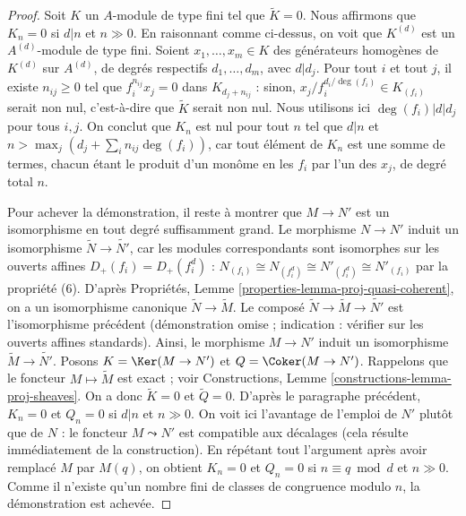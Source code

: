 \begin{proof}
\medskip\noindent
Soit $K$ un $A$-module de type fini tel que $\widetilde{K} = 0$. Nous affirmons que
$K_n = 0$ si $d|n$ et $n \gg 0$. En raisonnant comme ci-dessus, on voit que
$K^{(d)}$ est un $A^{(d)}$-module de type fini. Soient
$x_1, \ldots, x_m \in K$ des générateurs homogènes de $K^{(d)}$ sur
$A^{(d)}$, de degrés respectifs $d_1, \ldots, d_m$, avec $d | d_j$. Pour tout
$i$ et tout $j$, il existe $n_{ij} \geq 0$ tel que
$f_i^{n_{ij}} x_j = 0$ dans $K_{d_j + n_{ij}}$ : sinon,
$x_j/f_i^{d_i/\deg(f_i)} \in K_{(f_i)}$ serait non nul, c'est-à-dire que
$\widetilde{K}$ serait non nul. Nous utilisons ici
$\deg(f_i) | d | d_j$ pour tous $i, j$. On conclut que $K_n$ est nul pour tout
$n$ tel que $d | n$ et $n > \max_j (d_j + \sum_i n_{ij} \deg(f_i))$, car tout élément de
$K_n$ est une somme de termes, chacun étant le produit d'un monôme en les
$f_i$ par l'un des $x_j$, de degré total $n$.

\medskip\noindent
Pour achever la démonstration, il reste à montrer que $M \to N'$ est un
isomorphisme en tout degré suffisamment grand. Le morphisme $N \to N'$ induit
un isomorphisme $\widetilde{N} \to \widetilde{N'}$, car les modules
correspondants sont isomorphes sur les ouverts affines
$D_+(f_i) = D_+(f_i^d)$ :
$N_{(f_i)} \cong N_{(f_i^d)} \cong N'_{(f_i^d)} \cong N'_{(f_i)}$
par la propriété (6). D'après Propriétés, Lemme
\ref{properties-lemma-proj-quasi-coherent}, on a un isomorphisme canonique
$\widetilde{N} \to \widetilde{M}$. Le composé
$\widetilde{N} \to \widetilde{M} \to \widetilde{N'}$ est l'isomorphisme
précédent (démonstration omise ; indication : vérifier sur les ouverts affines
standards). Ainsi, le morphisme $M \to N'$ induit un isomorphisme
$\widetilde{M} \to \widetilde{N'}$.
Posons $K = \Ker(M \to N')$ et $Q = \Coker(M \to N')$. Rappelons que le
foncteur $M \mapsto \widetilde{M}$ est exact ; voir Constructions, Lemme
\ref{constructions-lemma-proj-sheaves}. On a donc $\widetilde{K} = 0$ et
$\widetilde{Q} = 0$. D'après le paragraphe précédent, $K_n = 0$ et $Q_n = 0$
si $d | n$ et $n \gg 0$. On voit ici l'avantage de l'emploi de $N'$ plutôt que
de $N$ : le foncteur $M \leadsto N'$ est compatible aux décalages (cela résulte
immédiatement de la construction). En répétant tout l'argument après avoir
remplacé $M$ par $M(q)$, on obtient $K_n = 0$ et $Q_n = 0$ si
$n \equiv q \bmod d$ et $n \gg 0$. Comme il n'existe qu'un nombre fini de
classes de congruence modulo $n$, la démonstration est achevée.
\end{proof}

